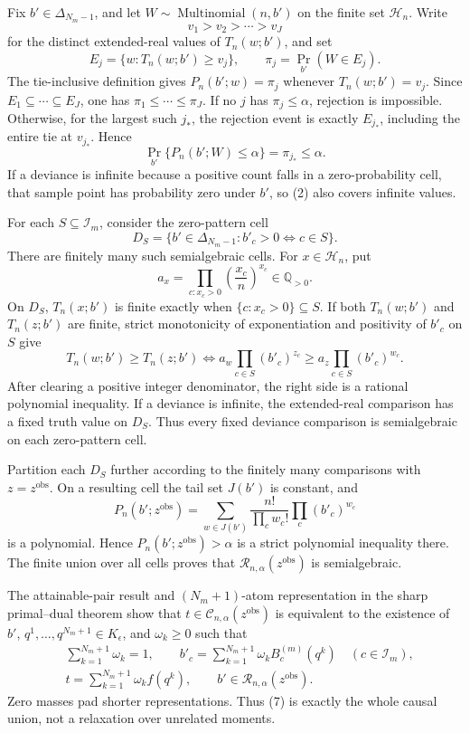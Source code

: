 Fix \(b'\in\Delta_{N_m-1}\), and let \(W\sim\operatorname{Multinomial}(n,b')\) on the finite set \(\mathcal H_n\).  Write
\[
 v_1>v_2>\cdots>v_J
\]
for the distinct extended-real values of \(T_n(w;b')\), and set
\[
 E_j=\{w:T_n(w;b')\geq v_j\},
 \qquad \pi_j=\Pr_{b'}(W\in E_j).
\tag{1}
\]
The tie-inclusive definition gives \(P_n(b';w)=\pi_j\) whenever \(T_n(w;b')=v_j\).  Since \(E_1\subseteq\cdots\subseteq E_J\), one has \(\pi_1\leq\cdots\leq\pi_J\).  If no \(j\) has \(\pi_j\leq\alpha\), rejection is impossible.  Otherwise, for the largest such \(j_*\), the rejection event is exactly \(E_{j_*}\), including the entire tie at \(v_{j_*}\).  Hence
\[
 \Pr_{b'}\{P_n(b';W)\leq\alpha\}
 =\pi_{j_*}\leq\alpha.
\tag{2}
\]
If a deviance is infinite because a positive count falls in a zero-probability cell, that sample point has probability zero under \(b'\), so (2) also covers infinite values.

For each \(S\subseteq\mathcal I_m\), consider the zero-pattern cell
\[
 D_S=\{b'\in\Delta_{N_m-1}:b'_c>0\Longleftrightarrow c\in S\}.
\tag{3}
\]
There are finitely many such semialgebraic cells.  For \(x\in\mathcal H_n\), put
\[
 a_x=\prod_{c:x_c>0}\left(\frac{x_c}{n}\right)^{x_c}\in\mathbb Q_{>0}.
\tag{4}
\]
On \(D_S\), \(T_n(x;b')\) is finite exactly when \(\{c:x_c>0\}\subseteq S\).  If both \(T_n(w;b')\) and \(T_n(z;b')\) are finite, strict monotonicity of exponentiation and positivity of \(b'_c\) on \(S\) give
\[
 T_n(w;b')\geq T_n(z;b')
 \Longleftrightarrow
 a_w\prod_{c\in S}(b'_c)^{z_c}
 \geq a_z\prod_{c\in S}(b'_c)^{w_c}.
\tag{5}
\]
After clearing a positive integer denominator, the right side is a rational polynomial inequality.  If a deviance is infinite, the extended-real comparison has a fixed truth value on \(D_S\).  Thus every fixed deviance comparison is semialgebraic on each zero-pattern cell.

Partition each \(D_S\) further according to the finitely many comparisons with \(z=z^{\mathrm{obs}}\).  On a resulting cell the tail set \(J(b')\) is constant, and
\[
 P_n(b';z^{\mathrm{obs}})
 =\sum_{w\in J(b')}\frac{n!}{\prod_cw_c!}\prod_c(b'_c)^{w_c}
\tag{6}
\]
is a polynomial.  Hence \(P_n(b';z^{\mathrm{obs}})>\alpha\) is a strict polynomial inequality there.  The finite union over all cells proves that \(\mathcal R_{n,\alpha}(z^{\mathrm{obs}})\) is semialgebraic.

The attainable-pair result and \((N_m+1)\)-atom representation in the sharp primal--dual theorem show that \(t\in\mathcal C_{n,\alpha}(z^{\mathrm{obs}})\) is equivalent to the existence of \(b'\), \(q^1,\ldots,q^{N_m+1}\in K_{\epsilon}\), and \(\omega_k\geq0\) such that
\[
 \begin{split}
 &\sum_{k=1}^{N_m+1}\omega_k=1,
 \qquad b'_c=\sum_{k=1}^{N_m+1}\omega_kB_c^{(m)}(q^k)
 \quad(c\in\mathcal I_m),\\
 &t=\sum_{k=1}^{N_m+1}\omega_kf(q^k),
 \qquad b'\in\mathcal R_{n,\alpha}(z^{\mathrm{obs}}).
 \end{split}
\tag{7}
\]
Zero masses pad shorter representations.  Thus (7) is exactly the whole causal union, not a relaxation over unrelated moments.

